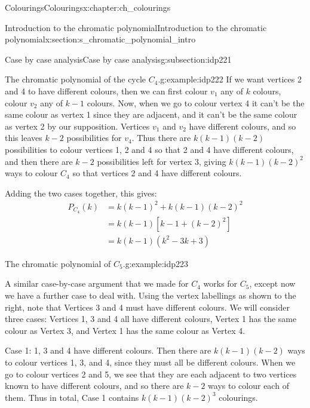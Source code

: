 \documentclass[oneside,10pt,]{book}
\numberwithin{equation}{section}
\newcommand{\amp}{&}
\begin{document}
\begin{chapterptx}{Colourings}{}{Colourings}{}{}{x:chapter:ch_colourings}
\begin{sectionptx}{Introduction to the chromatic polynomial}{}{Introduction to the chromatic polynomial}{}{}{x:section:s_chromatic_polynomial_intro}
\begin{subsectionptx}{Case by case analysis}{}{Case by case analysis}{}{}{g:subsection:idp221}
\begin{example}{The chromatic polynomial of the cycle \(C_4\).}{g:example:idp222}
If we want vertices 2 and 4 to have different colours, then we can first colour \(v_1\) any of \(k\) colours, colour \(v_2\) any of \(k-1\) colours.  Now, when we go to colour vertex 4 it can't be the same colour as vertex 1 since they are adjacent, and it can't be the same colour as vertex 2 by our supposition.  Vertices \(v_1\) and \(v_2\) have different colours, and so this leaves \(k-2\) possibilities for \(v_4\).  Thus there are \(k(k-1)(k-2)\) possibilities to colour vertices 1, 2 and 4 so that 2 and 4 have different colours, and then there are \(k-2\) possibilities left for vertex 3, giving \(k(k-1)(k-2)^2\) ways to colour \(C_4\) so that vertices 2 and 4 have different colours.%
\par
Adding the two cases together, this gives:%
%
\begin{align*}
P_{C_4}(k)\amp=k(k-1)^2+k(k-1)(k-2)^2\\
\amp=k(k-1)[k-1+(k-2)^2]\\
\amp=k(k-1)(k^2-3k+3)
\end{align*}
\end{example}
\begin{example}{The chromatic polynomial of \(C_5\).}{g:example:idp223}%
\begin{sidebyside}{2}{0.025}{0.025}{0.05}%
\begin{sbspanel}{0.6}%
A similar case-by-case argument that we made for \(C_4\) works for \(C_5\), except now we have a further case to deal with.  Using the vertex labellings as shown to the right, note that Vertices 3 and 4 must have different colours.  We will consider three cases: Vertices 1, 3 and 4 all have different colours, Vertex 1 has the same colour as Vertex 3, and Vertex 1 has the same colour as Vertex 4.%
\end{sbspanel}%
\begin{sbspanel}{0.3}%
%
\end{sbspanel}%
\end{sidebyside}%
Case 1: 1, 3 and 4 have different colours.  Then there are \(k(k-1)(k-2)\) ways to colour vertices 1, 3, and 4, since they must all be different colours.  When we go to colour vertices 2 and 5, we see that they are each adjacent to two vertices known to have different colours, and so there are \(k-2\) ways to colour each of them.  Thus in total, Case 1 contains \(k(k-1)(k-2)^3\) colourings.%

\end{example}
\end{subsectionptx}
\end{sectionptx}
\end{chapterptx}
\end{document}
